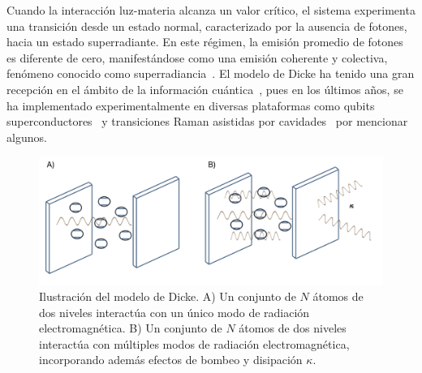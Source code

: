 \documentclass[onecolumn,notitlepage,letterpaper,aps,pra,12pt]{article}
\numberwithin{equation}{section}
\begin{document}
Cuando la interacción luz-materia alcanza un valor crítico, el sistema experimenta una transición desde un estado normal, caracterizado por la ausencia de fotones, hacia un estado superradiante. %
En este régimen, la emisión promedio de fotones es diferente de cero, manifestándose como una emisión coherente y colectiva, fenómeno conocido como superradiancia~\cite{gross1982}. El modelo de Dicke ha tenido una gran recepción en el ámbito de la información cuántica~\cite{Garraway2011,Kirton2019,LeBoite2020}, pues en los últimos años, se ha implementado experimentalmente en diversas plataformas como qubits superconductores~\cite{Blais04,Casanova10} y transiciones Raman asistidas por cavidades~\cite{Baden14,Nagy10} por mencionar algunos. 
\begin{figure}[H]
    \centering
    \includegraphics[width=0.9
\linewidth]{Images/cavity1.png}
    \caption{Ilustración del modelo de Dicke. 
A) Un conjunto de \( N \) átomos de dos niveles interactúa con un único modo de radiación electromagnética. 
B) Un conjunto de \( N \) átomos de dos niveles interactúa con múltiples modos de radiación electromagnética, incorporando además efectos de bombeo y disipación \( \kappa \).}
    \label{Figure Cavity}
\end{figure}
\end{document}
